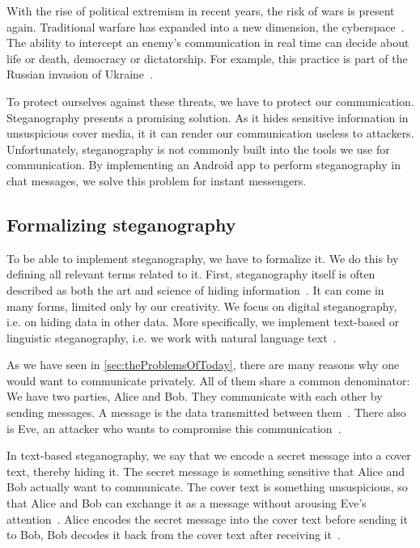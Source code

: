 With the rise of political extremism in recent years, the risk of wars is present again. Traditional warfare has expanded into a new dimension, the cyberspace~\cite{serpanosCyberwarfareUkraine2022}. The ability to intercept an enemy's communication in real time can decide about life or death, democracy or dictatorship. For example, this practice is part of the Russian invasion of Ukraine~\cite{sufiSocialMediaAnalytics2023}.

To protect ourselves against these threats, we have to protect our communication. Steganography presents a promising solution. As it hides sensitive information in unsuspicious cover media, it it can render our communication useless to attackers. Unfortunately, steganography is not commonly built into the tools we use for communication. By implementing an Android app to perform steganography in chat messages, we solve this problem for instant messengers.

\subsection{Formalizing steganography}
\label{sec:formalizingSteganography}
To be able to implement steganography, we have to formalize it. We do this by defining all relevant terms related to it. First, steganography itself is often described as both the art and science of hiding information~\cite{bennettLinguisticSteganographySurvey2004,wuGenerativeTextSteganography2024}. It can come in many forms, limited only by our creativity. We focus on digital steganography, i.e. on hiding data in other data. More specifically, we implement text-based or linguistic steganography, i.e. we work with natural language text~\cite{zieglerNeuralLinguisticSteganography2019}.

As we have seen in \cref{sec:theProblemsOfToday}, there are many reasons why one would want to communicate privately. All of them share a common denominator: We have two parties, Alice and Bob. They communicate with each other by sending messages. A message is the data transmitted between them~\cite{wuGenerativeTextSteganography2024}. There also is Eve, an attacker who wants to compromise this communication~\cite{al-aniOverviewMainFundamentals2010,wuGenerativeTextSteganography2024}.

In text-based steganography, we say that we encode a secret message into a cover text, thereby hiding it. The secret message is something sensitive that Alice and Bob actually want to communicate. The cover text is something unsuspicious, so that Alice and Bob can exchange it as a message without arousing Eve's attention~\cite{al-aniOverviewMainFundamentals2010}. Alice encodes the secret message into the cover text before sending it to Bob, Bob decodes it back from the cover text after receiving it~\cite{al-aniOverviewMainFundamentals2010}.

